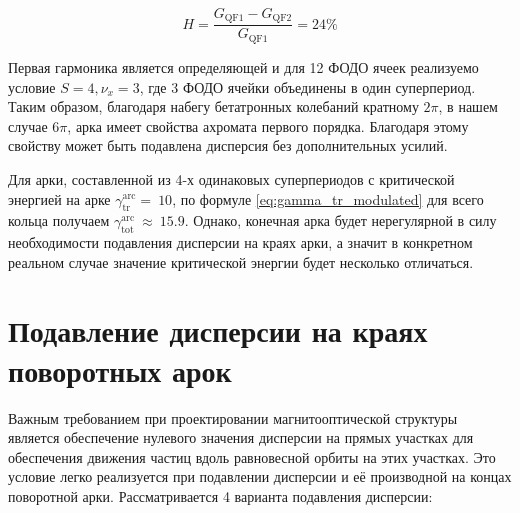 \begin{equation}
H=\frac{G_{\textrm{QF1}}-G_{\textrm{QF2}}}{G_{\textrm{QF1}}}=24\%
\label {eq:modulated_coeff}
\end{equation}

\par Первая гармоника является определяющей и для 12 ФОДО ячеек реализуемо условие $S=4, \nu_x=3$, где 3 ФОДО ячейки объединены в один суперпериод. Таким образом, благодаря набегу бетатронных колебаний кратному $2\pi$, в нашем случае $6\pi$, арка имеет свойства ахромата первого порядка. Благодаря этому свойству может быть подавлена дисперсия без дополнительных усилий.

\par Для арки, составленной из 4-х одинаковых суперпериодов с критической энергией  на арке $\gamma_{\text{tr}}^{\text{arc}}=\ 10$, по формуле \ref{eq:gamma_tr_modulated} для всего кольца получаем $\gamma_{\text{tot}}^{\text{arc}}\ \approx\ 15.9$. Однако, конечная арка будет нерегулярной в силу необходимости подавления дисперсии на краях арки, а значит в конкретном реальном случае значение критической энергии будет несколько отличаться.

\section{Подавление дисперсии на краях поворотных арок}\label{sec:transition_variation/disp_supperssion}

\par Важным требованием при проектировании магнитооптической структуры является обеспечение нулевого значения дисперсии на прямых участках для обеспечения движения частиц вдоль равновесной орбиты на этих участках. Это условие легко реализуется при подавлении дисперсии и её производной на концах поворотной арки. Рассматривается 4 варианта подавления дисперсии:

